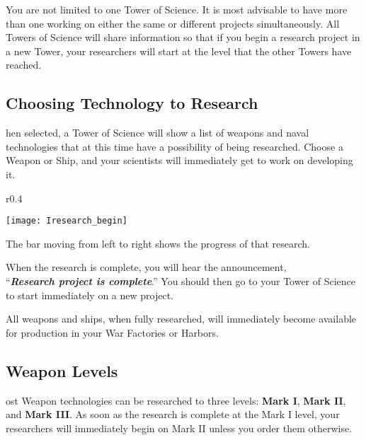 
You are not limited to one Tower of Science. It is most advisable to have more than one working on either the same or different projects simultaneously. All Towers of Science will share information so that if you begin a research project in a new Tower, your researchers will start at the level that the other Towers have reached.

\subsection{\textsf{Choosing Technology to Research}}


hen selected, a Tower of Science will show a list of weapons and naval technologies that at this time have a possibility of being researched. Choose a Weapon or Ship, and your scientists will immediately get to work on developing it.

\begin{wrapfigure}{r}{0.4\textwidth}
	\vspace{-20pt}
	\begin{center}
		\texttt{[image: Iresearch\_begin]} %
	\end{center}
	\vspace{-20pt}
\end{wrapfigure}

The bar moving from left to right shows the progress of that research.

When the research is complete, you will hear the announcement, \\ %
“\textbf{\textit{Research project is complete}}.” You should then go to your Tower of Science to start immediately on a new project.

All weapons and ships, when fully researched, will immediately become available for production in your War Factories or Harbors.

\subsection{\textsf{Weapon Levels}}


ost Weapon technologies can be researched to three levels: \textbf{Mark I}, \textbf{Mark II}, and \textbf{Mark III}. As soon as the research is complete at the Mark I level, your researchers will immediately begin on Mark II unless you order them otherwise.

